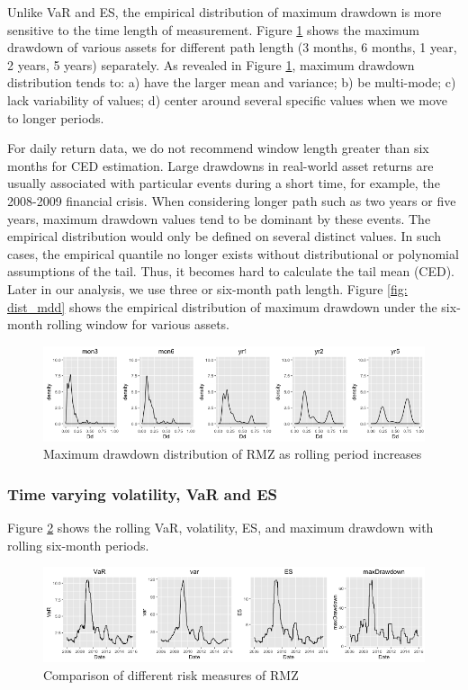 \documentclass[11pt]{article}
\begin{document}
Unlike VaR and ES, the empirical distribution of maximum drawdown is more sensitive to the time length of measurement. Figure \ref{fig: dmaxdd_RMZ} shows the maximum drawdown of various assets for different path length (3 months, 6 months, 1 year, 2 years, 5 years) separately. As revealed in Figure \ref{fig: dmaxdd_RMZ}, maximum drawdown distribution tends to: a) have the larger mean and variance; b) be multi-mode; c) lack variability of values; d) center around several specific values when we move to longer periods. 

For daily return data, we do not recommend window length greater than six months for CED estimation. Large drawdowns in real-world asset returns are usually associated with particular events during a short time, for example, the 2008-2009 financial crisis. When considering longer path such as two years or five years, maximum drawdown values tend to be dominant by these events. The empirical distribution would only be defined on several distinct values. In such cases, the empirical quantile no longer exists without distributional or polynomial assumptions of the tail. Thus, it becomes hard to calculate the tail mean (CED). Later in our analysis, we use three or six-month path length. Figure \ref{fig: dist_mdd} shows the empirical distribution of maximum drawdown under the six-month rolling window for various assets.

\begin{figure}
\centering 
\includegraphics[width = 1\textwidth]{../results/maxdd_RMZ}
\caption{Maximum drawdown distribution of RMZ as rolling period increases} 
\label{fig: dmaxdd_RMZ}
\end{figure}

\subsubsection{Time varying volatility, VaR and ES}

Figure \ref{fig: risk_meausre_RMZ} shows the rolling VaR, volatility, ES, and maximum drawdown with rolling six-month periods. 


\begin{figure}
\centering 
\includegraphics[width = 1\textwidth]{../results/risk_measure_RMZ}
\caption{Comparison of different risk measures of RMZ} 
\label{fig: risk_meausre_RMZ}
\end{figure}
\end{document}
